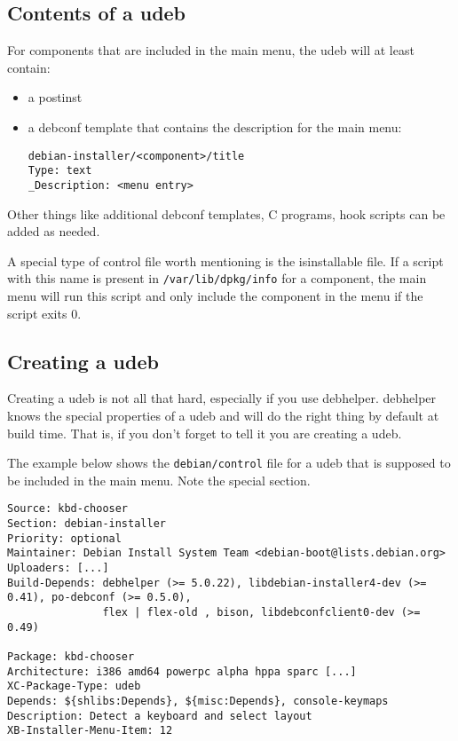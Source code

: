 \documentclass[a4paper,10pt]{article}
\begin{document}
\subsection{Contents of a udeb}
For components that are included in the main menu, the udeb will at least contain: 

\begin{itemize}
\item a postinst 
\item a debconf template that contains the description for the main menu:
  \begin{verbatim}
debian-installer/<component>/title
Type: text
_Description: <menu entry>
  \end{verbatim}
\end{itemize}

Other things like additional debconf templates, C programs, hook scripts can be added as needed. 

A special type of control file worth mentioning is the isinstallable file. If a script with this name is present in \texttt{/var/lib/dpkg/info} for a component, the main menu will run this script and only include the component in the menu if the script exits 0. 


\subsection{Creating a udeb}
Creating a udeb is not all that hard, especially if you use debhelper. debhelper knows the special properties of a udeb and will do the right thing by default at build time. That is, if you don't forget to tell it you are creating a udeb. 

The example below shows the \texttt{debian/control} file for a udeb that is supposed to be included in the main menu. Note the special section.

\begin{verbatim}
Source: kbd-chooser
Section: debian-installer
Priority: optional
Maintainer: Debian Install System Team <debian-boot@lists.debian.org>
Uploaders: [...]
Build-Depends: debhelper (>= 5.0.22), libdebian-installer4-dev (>= 0.41), po-debconf (>= 0.5.0),
               flex | flex-old , bison, libdebconfclient0-dev (>= 0.49)

Package: kbd-chooser
Architecture: i386 amd64 powerpc alpha hppa sparc [...]
XC-Package-Type: udeb
Depends: ${shlibs:Depends}, ${misc:Depends}, console-keymaps
Description: Detect a keyboard and select layout
XB-Installer-Menu-Item: 12
\end{verbatim}
\end{document}
